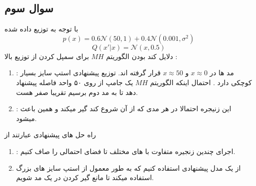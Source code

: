 \subsection{سوال سوم}
با توجه به توزیع داده شده 
\begin{equation*}
    p(x) = 0.6 \mathcal{N}(50,1) + 0.4\mathcal{N}(0.001,\sigma^2) 
\end{equation*}
\begin{equation*}
    Q(x'|x) = \mathcal{N}(x,0.5) 
\end{equation*}
دلایل کند بودن الگوریتم $MH$ برای سمپل کردن از توزیع بالا :
\begin{enumerate}
    \item {} : مد ها در $x\approx 0$ و $x\approx 50$ قرار گرفته اند. توزیع پیشنهادی استپ سایز بسیار کوچکی دارد . احتمال اینکه الگوریتم $MH$ یک جامپ از روی ۵۰ واحد فاصله پیشنهاد دهد تا به مد دوم برسیم تقریبا صفر هست.
    \item {} : این زنیجره احتمالا در هر مدی که از آن شروع کند گیر میکند و همین باعث  میشود.
\end{enumerate}
راه حل های پیشنهادی عبارتند از 
\begin{enumerate}
    \item {} : اجرای چندین زنجیره متفاوت با  های مختلف تا فضای احتمالی را صاف کنیم.
    \item از یک مدل پیشنهادی استفاده کنیم که به طور معمول از استپ سایز های بزرگ استفاده میکند تا مانع گیر کردن در یک مد شویم.
\end{enumerate}
